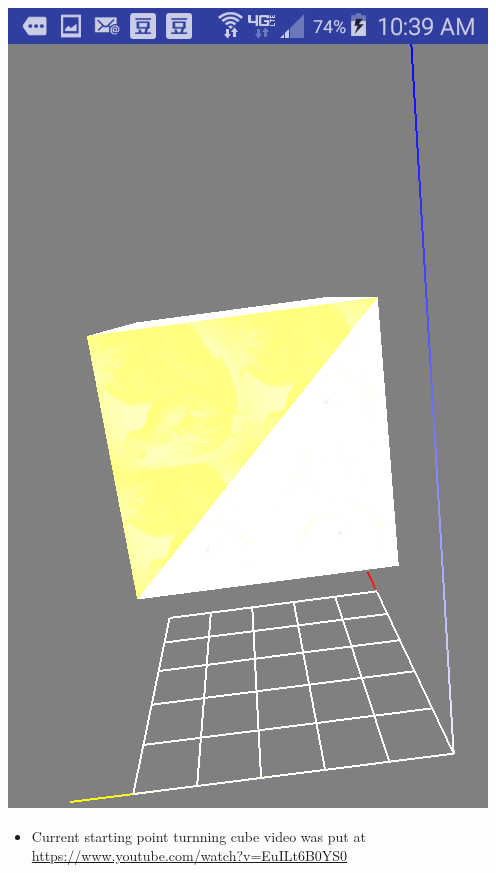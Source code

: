 \documentclass[9pt,b5paper]{article}
\begin{document}
\includegraphics[width=.9\linewidth]{./Screenshot_2016-04-30-10-39-54.png}
\begin{itemize}
\item Current starting point turnning cube video was put at \url{https://www.youtube.com/watch?v=EuILt6B0YS0}
\end{itemize}
\end{document}
